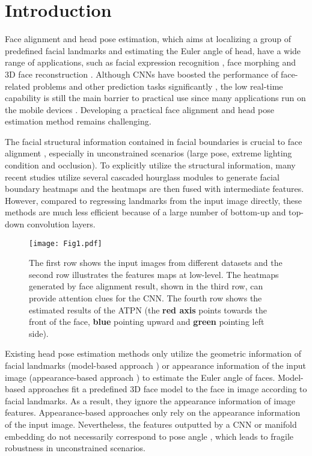 \documentclass[3p,twocolumn, round, sort & compress]{elsarticle}
\begin{document}
\section{Introduction} \label{sec:intro}

Face alignment and head pose estimation, which aims at localizing a group of predefined facial landmarks and estimating the Euler angle of head, have a wide range of applications, such as facial expression recognition \citep{facial_expression}, face morphing \citep{face_morphing} and 3D face reconstruction \citep{face_recostruction}. Although CNNs have boosted the performance of face-related problems and other prediction tasks significantly \citep{ANNA, ANNW, MEP, PPO, FOG}, the low real-time capability is still the main barrier to practical use since many applications run on the mobile devices \citep{fatigue}. Developing a practical face alignment and head pose estimation method remains challenging.


The facial structural information contained in facial boundaries is crucial to face alignment \citep{PropNet}, especially in unconstrained scenarios (large pose, extreme lighting condition and occlusion). To explicitly utilize the structural information, many recent studies \citep{LAB, PropNet} utilize several cascaded hourglass modules \citep{Hourglass} to generate facial boundary heatmaps and the heatmaps are then fused with intermediate features. However, compared to regressing landmarks from the input image directly, these methods are much less efficient because of a large number of bottom-up and top-down convolution layers.

\begin{figure}[t!]
	\centering
	\texttt{[image: Fig1.pdf]}
	\caption{The first row shows the input images from different datasets and the second row illustrates the features maps at low-level. The heatmaps generated by face alignment result, shown in the third row, can provide attention clues for the CNN. The fourth row shows the estimated results of the ATPN (the {\color{red} \textbf{red axis}} points towards the front of the face, {\color{blue} \textbf{blue}} pointing upward and {\color{green} \textbf{green}} pointing left side).} 
	\label{fig1}
\end{figure}

Existing head pose estimation methods only utilize the geometric information of facial landmarks (model-based approach \citep{accurate_model,Openface}) or appearance information of the input image (appearance-based approach \citep{Robust_pose,Ruzi, Multitask-pose, Hyperface}) to estimate the Euler angle of faces. Model-based approaches fit a predefined 3D face model to the face in image according to facial landmarks. As a result, they ignore the appearance information of image features. Appearance-based approaches only rely on the appearance information of the input image. Nevertheless, the features outputted by a CNN or manifold embedding do not necessarily correspond to pose angle \citep{Robust_pose}, which leads to fragile robustness in unconstrained scenarios.  
\end{document}
